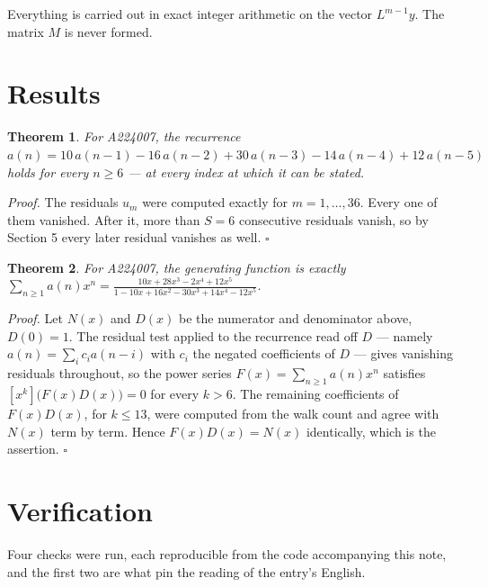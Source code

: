 \documentclass[11pt]{article}
\newtheorem{theorem}{Theorem}
\theoremstyle{definition}
\begin{document}
Everything is carried out in exact integer arithmetic on the vector $L^{m-1}y$. The matrix $M$ is never formed.

\section{Results}

\begin{theorem} For A224007, the recurrence $a(n) = 10\,a(n-1) - 16\,a(n-2) + 30\,a(n-3) - 14\,a(n-4) + 12\,a(n-5)$ holds for every $n \ge 6$ --- at every index at which it can be stated.\end{theorem}

{\itshape Proof.} The residuals $u_m$ were computed exactly for $m = 1,\dots,36$. Every one of them vanished. After it, more than $S = 6$ consecutive residuals vanish, so by Section 5 every later residual vanishes as well. $\square$

\begin{theorem} For A224007, the generating function is exactly $\sum_{n\ge 1} a(n)x^n = \frac{10x + 28x^{3} - 2x^{4} + 12x^{5}}{1 - 10x + 16x^{2} - 30x^{3} + 14x^{4} - 12x^{5}}$.\end{theorem}

{\itshape Proof.} Let $N(x)$ and $D(x)$ be the numerator and denominator above, $D(0)=1$. The residual test applied to the recurrence read off $D$ --- namely $a(n) = \sum_i c_i a(n-i)$ with $c_i$ the negated coefficients of $D$ --- gives vanishing residuals throughout, so the power series $F(x)=\sum_{n\ge 1}a(n)x^n$ satisfies $[x^k]\bigl(F(x)D(x)\bigr) = 0$ for every $k > 6$. The remaining coefficients of $F(x)D(x)$, for $k \le 13$, were computed from the walk count and agree with $N(x)$ term by term. Hence $F(x)D(x) = N(x)$ identically, which is the assertion. $\square$

\section{Verification}

Four checks were run, each reproducible from the code accompanying this note, and the first two are what pin the reading of the entry's English.
\end{document}
